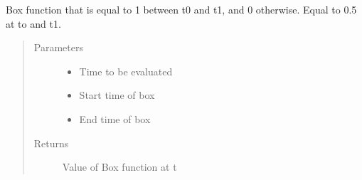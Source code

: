 \documentclass[letterpaper,10pt,english]{sphinxmanual}
\begin{document}
\begin{fulllineitems}
\begin{fulllineitems}
\begin{quote}
\begin{description}
\end{description}\end{quote}

\end{fulllineitems}


\begin{fulllineitems}
\label{\detokenize{index:flarestack.core.time_pdf.TimePDF.subclasses}}
\end{fulllineitems}


\end{fulllineitems}


\begin{fulllineitems}
\label{\detokenize{index:flarestack.core.time_pdf.box_func}}
Box function that is equal to 1 between t0 and t1, and 0 otherwise.
Equal to 0.5 at to and t1.
\begin{quote}\begin{description}
\item[{Parameters}] \leavevmode\begin{itemize}
\item {} 
 \textendash{} Time to be evaluated

\item {} 
 \textendash{} Start time of box

\item {} 
 \textendash{} End time of box

\end{itemize}

\item[{Returns}] \leavevmode
Value of Box function at t

\end{description}\end{quote}

\end{fulllineitems}
\end{document}
